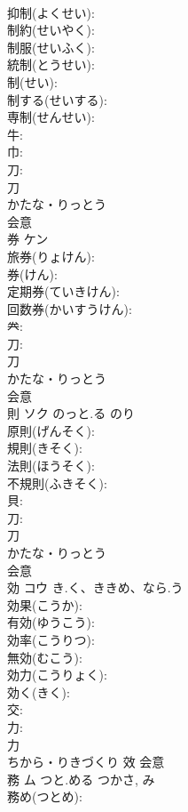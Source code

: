 \documentclass[8pt]{extreport}
\begin{document}
\begin{CJK}{UTF8}{min}
\\	抑制(よくせい): 
\\	制約(せいやく): 
\\	制服(せいふく): 
\\	統制(とうせい): 
\\	制(せい): 
\\	制する(せいする): 
\\	専制(せんせい): 
\\	牛: 
\\	巾: 
\\	刀: 
\\	刀	
\\	かたな・りっとう	
\\	会意 
\\	券	ケン			
\\	旅券(りょけん): 
\\	券(けん): 
\\	定期券(ていきけん): 
\\	回数券(かいすうけん): 
\\	𠔉: 
\\	刀: 
\\	刀	
\\	かたな・りっとう	
\\	会意 
\\	則	ソク	のっと.る	のり	
\\	原則(げんそく): 
\\	規則(きそく): 
\\	法則(ほうそく): 
\\	不規則(ふきそく): 
\\	貝: 
\\	刀: 
\\	刀	
\\	かたな・りっとう	
\\	会意 
\\	効	コウ	き.く、ききめ、なら.う		
\\	効果(こうか): 
\\	有効(ゆうこう): 
\\	効率(こうりつ): 
\\	無効(むこう): 
\\	効力(こうりょく): 
\\	効く(きく): 
\\	交: 
\\	力: 
\\	力	
\\	ちから・りきづくり	效	会意 
\\	務	ム	つと.める	つかさ, み	
\\	務め(つとめ): 

\end{CJK}
\end{document}
